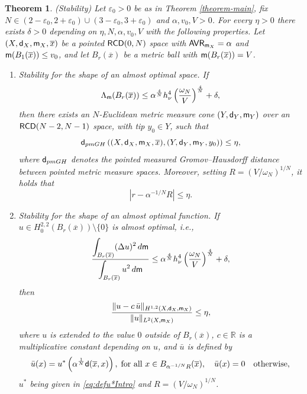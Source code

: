 \documentclass[11pt, reqno]{amsart}
\newtheorem{theorem}{Theorem}[section]
\numberwithin{equation}{section}
\begin{document}
		\begin{theorem}\label{theorem-main-stability} {\rm (Stability)}
		Let $\varepsilon_{0}>0$ be as in Theorem \ref{theorem-main}, fix $N\in (2-\varepsilon_{0}, 2+ \varepsilon_{0}) \cup (3-\varepsilon_{0}, 3+ \varepsilon_{0})$ and $\alpha,v_0, V>0$. For every $\eta>0$ there exists $\delta>0$ depending on $\eta, N, \alpha, v_0, V$ with the following properties.
  Let  $(X, {\sf d}_{X}, {\sf m}_{X}, \overline x)$ be a pointed  ${\sf RCD}(0,N)$ space with ${\sf AVR}_ {{\sf m}_{X}}=\alpha$ and ${\sf m}(B_{1}(\overline x))\leq v_0$, and let  $B_r(\overline x)$ be a metric ball with ${\sf m}(B_r(\overline x))=V$.
  \begin{enumerate}
\item[(i)] \emph{Stability for the shape of an almost optimal space.}		If 
	\begin{equation}\label{eq:ASSMdelta}
		\Lambda_{\sf m}(B_r(\overline x)) \leq \alpha^\frac{4}{N} h_\nu^4 \left(\frac{\omega_N}{V} \right)^\frac{4}{N} + \delta, 
		\end{equation}
		then there exists an $N$-Euclidean metric measure cone $(Y, {\sf d}_{Y}, {\sf m}_{Y})$   over an ${\sf RCD}(N-2,N-1)$ space, with tip  $y_{0}\in Y$,  such that 
		\begin{equation}\label{eq:Thesiseta}
		 {\sf d}_{\rm pmGH}\left( (X, {\sf d}_{X}, {\sf m}_{X}, \overline x), (Y, {\sf d}_{Y}, {\sf m}_{Y}, y_{0})  \right)\leq \eta,
		\end{equation}
		where  ${\sf d}_{\rm pmGH}$ denotes the pointed measured Gromov--Hausdorff distance between pointed metric measure spaces. Moreover, setting $R= (V / \omega_N)^{1/N}$, it holds that
 \begin{equation}\label{eq:r-Rleqeta}
  |r-\alpha^{-{1}/{N}}R|\leq \eta.
  \end{equation}

\item[(ii)] \emph{Stability for the shape of an almost optimal function.}	  If $u\in H^{2,2}_0(B_r(\overline x))\setminus\{0\}$ is almost optimal, i.e.,
  \begin{equation}
  	\frac{\displaystyle\int_{B_r(\overline x)} (\Delta u)^2 \, {\rm d}{\sf m}}{\displaystyle\int_{B_r(\overline x)} u^2\, {\rm d}{\sf m}} \leq \alpha^\frac{4}{N} h_\nu^4 \left(\frac{\omega_N}{V} \right)^\frac{4}{N} +  \delta, 
  \end{equation}
  then
  \begin{equation}
 \frac{\|u- c\, \bar u\|_{H^{1,2}(X, {\sf d}_X, {\sf m}_X)}} {\|u\|_{L^2(X, {\sf m}_X)}} \leq \eta, 
  \end{equation}
  where $u$ is extended to the value $0$ outside of $B_{r}(\overline x)$, $c\in \mathbb{R}$ is a multiplicative constant depending on $u$, and $\bar u$ is defined by 
  \begin{equation*}
\bar u(x)=u^*\left(\alpha^{\frac{1}{N}}{\sf d}(\overline x,x)\right),\; \text{for all }x\in B_{\alpha^{-{1}/{N}}R}(\overline x), \quad \bar u(x)=0 \quad  \text{otherwise},
 \end{equation*}
 $u^*$ being given in \eqref{eq:defu*Intro} and  $R= (V / \omega_N)^{1/N}$.
 \end{enumerate}
	\end{theorem}
	
\end{document}
